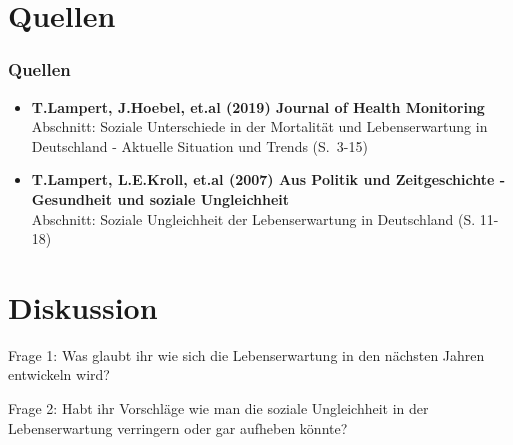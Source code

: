 \documentclass{beamer}
\begin{document}
\section{Quellen}
\begin{frame}
\frametitle{Quellen}
   \begin{itemize}
    \item \textbf{T.Lampert, J.Hoebel, et.al (2019) Journal of Health Monitoring}\\
    Abschnitt: Soziale Unterschiede in der Mortalität und Lebenserwartung in Deutschland - Aktuelle Situation und Trends (S.~3-15)
    
    \item \textbf{T.Lampert, L.E.Kroll, et.al (2007) Aus Politik und Zeitgeschichte - Gesundheit und soziale Ungleichheit}\\
Abschnitt: Soziale Ungleichheit der Lebenserwartung in Deutschland (S. 11-18)

    
    
  \end{itemize}

\end{frame}


\section{Diskussion}
\begin{frame}
	\begin{block}{Frage 1:}
		 Was glaubt ihr wie sich die Lebenserwartung in den nächsten Jahren entwickeln wird?
	\end{block}
	\pause  %
	\begin{block}{Frage 2:}
		 Habt ihr Vorschläge wie man die soziale Ungleichheit in der Lebenserwartung verringern oder gar aufheben könnte?
	\end{block}
\end{frame}
\end{document}
